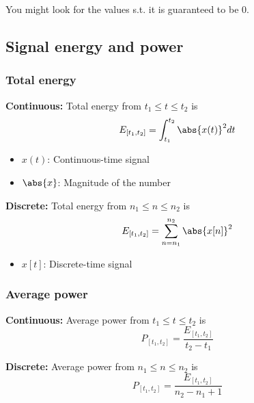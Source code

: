 \begin{warning}
    You might look for the values s.t. it is guaranteed to be 0.
\end{warning}

\subsection{Signal energy and power}
    \subsubsection{Total energy}
    \begin{definition}
        
        \textbf{Continuous:} Total energy from $t_1 \leq t \leq t_2$ is 
        \begin{equation}
            E_{[t_1,t_2]} = \int_{t_1}^{t_2} \abs{x(t)}^2 dt
        \end{equation}
        \begin{itemize}
            \item $x(t)$: Continuous-time signal
            \item $\abs{x}$: Magnitude of the number
        \end{itemize}

        \textbf{Discrete:} Total energy from $n_1 \leq n \leq n_2$ is
        \begin{equation}
            E_{[t_1,t_2]} = \sum_{n=n_1}^{n_2} \abs{x[n]}^2
        \end{equation}
        \begin{itemize}
            \item $x[t]$: Discrete-time signal
        \end{itemize}
    \end{definition}

    \subsubsection{Average power}
    \begin{definition}

        \textbf{Continuous:} Average power from $t_1 \leq t \leq t_2$ is 
        \begin{equation}
            P_{[t_1,t_2]} = \frac{E_{[t_1,t_2]}}{t_2 - t_1} 
        \end{equation}

        \textbf{Discrete:} Average power from $n_1 \leq n \leq n_2$ is
        \begin{equation}
            P_{[t_1,t_2]} = \frac{E_{[t_1,t_2]}}{n_2 - n_1 + 1} 
        \end{equation}
    \end{definition}

